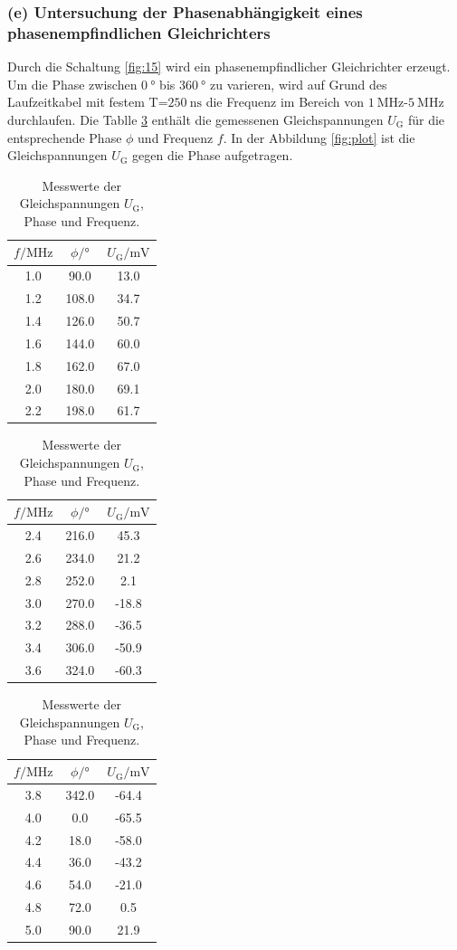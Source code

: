 \subsubsection{(e) Untersuchung der Phasenabhängigkeit eines
phasenempfindlichen Gleichrichters}
\label{subsubsec:auswertung_e}
Durch die Schaltung \ref{fig:15} wird ein phasenempfindlicher
Gleichrichter erzeugt. Um die Phase \phi zwischen
$\SI{0}{\degree}$ bis $\SI{360}{\degree}$ zu varieren, wird
auf Grund des Laufzeitkabel mit festem T=$\SI{250}{\nano\second}$
die Frequenz im Bereich von $\SI{1}{\mega\hertz}$-$\SI{5}{\mega\hertz}$
durchlaufen. Die Tablle \ref{tab:messwerte} enthält die gemessenen
Gleichspannungen $U_{\text{G}}$ für die entsprechende Phase $\phi$ und Frequenz $f$.
In der Abbildung \ref{fig:plot} ist die Gleichspannungen $U_{\text{G}}$
gegen die Phase aufgetragen.
\begin{table}
  \centering
  \caption{Messwerte der Gleichspannungen $U_{\text{G}}$, Phase \phi und Frequenz.}
  \label{tab:messwerte}
\begin{tabular}{c c c|}
\toprule
$f/\si{\mega\hertz}$ & $\phi / \si{\degree}$ &$ U_{\text{G}}/ \si{\milli\volt}$ \\
  \midrule
   1.0	&	90.0	&	13.0   \\
   1.2	&	108.0	&	34.7   \\
   1.4	&	126.0	&	50.7   \\
   1.6	&	144.0	&	60.0   \\
   1.8	&	162.0	&	67.0   \\
   2.0	&	180.0	&	69.1   \\
   2.2	&	198.0	&	61.7   \\
\bottomrule
\end{tabular}
\begin{tabular}{|c c c|}
  \toprule
  $f/\si{\mega\hertz}$ & $\phi / \si{\degree}$ &$ U_{\text{G}}/ \si{\milli\volt}$ \\
    \midrule
   2.4	&	216.0	&	45.3   \\
   2.6	&	234.0	&	21.2   \\
   2.8	&	252.0	&	2.1   \\
   3.0	&	270.0	&	-18.8   \\
   3.2	&	288.0	&	-36.5   \\
   3.4	&	306.0	&	-50.9   \\
   3.6	&	324.0	&	-60.3   \\
   \bottomrule
   \end{tabular}
  \begin{tabular}{|c c c}
    \toprule
    $f/\si{\mega\hertz}$ & $\phi / \si{\degree}$& $ U_{\text{G}}/ \si{\milli\volt}$ \\
      \midrule
   3.8	&	342.0	&	-64.4   \\
   4.0	&	0.0	&	-65.5   \\
   4.2	&	18.0	&	-58.0   \\
   4.4	&	36.0	&	-43.2   \\
   4.6	&	54.0	&	-21.0   \\
   4.8	&	72.0	&	0.5   \\
   5.0	&	90.0	&	21.9   \\
\bottomrule
\end{tabular}
\end{table}


